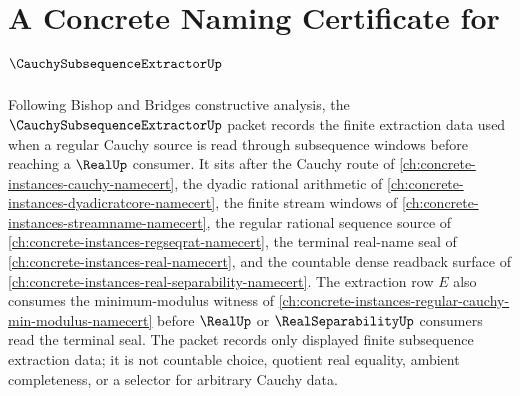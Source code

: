 \chapter{A Concrete Naming Certificate for $\CauchySubsequenceExtractorUp$}
\label{ch:concrete-instances-cauchy-subsequence-extractor-namecert}

Following Bishop and Bridges constructive analysis, the $\CauchySubsequenceExtractorUp$ packet records the finite extraction data used when a regular Cauchy source is read through subsequence windows before reaching a $\RealUp$ consumer. It sits after the Cauchy route of \autoref{ch:concrete-instances-cauchy-namecert}, the dyadic rational arithmetic of \autoref{ch:concrete-instances-dyadicratcore-namecert}, the finite stream windows of \autoref{ch:concrete-instances-streamname-namecert}, the regular rational sequence source of \autoref{ch:concrete-instances-regseqrat-namecert}, the terminal real-name seal of \autoref{ch:concrete-instances-real-namecert}, and the countable dense readback surface of \autoref{ch:concrete-instances-real-separability-namecert}. The extraction row $E$ also consumes the minimum-modulus witness of \autoref{ch:concrete-instances-regular-cauchy-min-modulus-namecert} before $\RealUp$ or $\RealSeparabilityUp$ consumers read the terminal seal. The packet records only displayed finite subsequence extraction data; it is not countable choice, quotient real equality, ambient completeness, or a selector for arbitrary Cauchy data.


